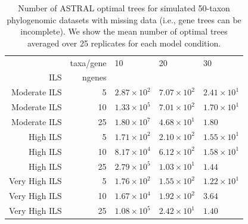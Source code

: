 \begin{table}
\centering

\begin{tabular}{|rr|lll|}
 
\hline
 &taxa/gene & 10 & 20 & 30\\
ILS&ngenes&&&\\



\hline 
\hline

Moderate ILS&5&	$2.87\times 10^{2}$	&$7.07\times 10^{2}$	&$2.41\times 10^{1}$\\
Moderate ILS&10&	$1.33\times 10^{5}$	&$7.01\times 10^{2}$	&$1.70\times 10^{1}$\\
Moderate ILS&25&	$1.80\times 10^{7}$	&$4.68\times 10^{1}$	&$1.80$\\
\hline
High ILS&5&	$1.71\times 10^{2}$	&$2.10\times 10^{2}$	&$1.55\times 10^{1}$\\
High ILS&10&	$8.17\times 10^{4}$	&$6.12\times 10^{2}$	&$1.58\times 10^{1}$\\
High ILS&25&	$2.79\times 10^{5}$	&$1.03\times 10^{1}$	&$1.44$\\
\hline
Very High ILS&5&	$1.76\times 10^{2}$	&$1.55\times 10^{2}$	&$1.22\times 10^{1}$\\
Very High ILS&10&	$1.67\times 10^{4}$	&$1.92\times 10^{2}$	&$3.64$\\
Very High ILS&25&	$1.08\times 10^{5}$	&$2.42\times 10^{1}$	&$1.40$\\
\hline
\end{tabular}


\caption[Number of ASTRAL optimal trees for simulated
  50-taxon phylogenomic datasets with missing data]{Number of ASTRAL optimal trees for simulated
  50-taxon phylogenomic datasets with missing data (i.e., gene trees can be incomplete). We show the mean number
  of optimal trees averaged over 25 replicates for each model condition.} \label{tab:astral-supertree_counts}
\end{table}



